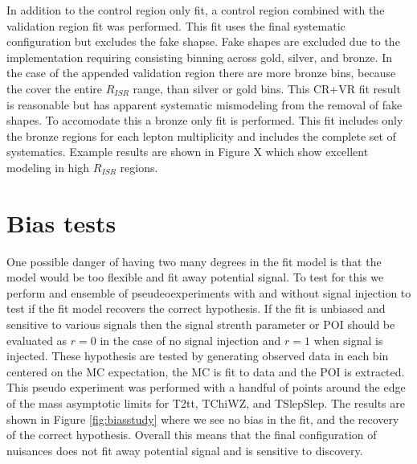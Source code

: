 In addition to the control region only fit, a control region combined with the validation region fit was performed. This fit uses the final systematic configuration but excludes the fake shapse. Fake shapes are excluded due to the implementation requiring consisting binning across gold, silver, and bronze. In the case of the appended validation region there are more bronze bins, because the cover the entire $R_{ISR}$ range, than silver or gold bins. This CR+VR fit result is reasonable but has apparent systematic mismodeling from the removal of fake shapes.  To accomodate this a bronze only fit is performed. This fit includes only the bronze regions for each lepton multiplicity and includes the complete set of systematics. Example results are shown in Figure X which show excellent modeling in high $R_{ISR}$ regions.

\section{Bias tests}

One possible danger of having two many degrees in the fit model is that the model would be too flexible and fit away potential signal. To test for this we perform and ensemble of pseudeoexperiments with and without signal injection to test if the fit model recovers the correct hypothesis.  If the fit is unbiased and sensitive to various signals then the signal strenth parameter or POI should be evaluated as $r=0$ in the case of no signal injection and $r=1$ when signal is injected.  These hypothesis are tested by generating observed data in each bin centered on the MC expectation, the MC is fit to data and the POI is extracted. This pseudo experiment was performed with a handful of points around the edge of the mass asymptotic limits for T2tt, TChiWZ, and TSlepSlep. The results are shown in Figure \ref{fig:biasstudy} where we see no bias in the fit, and the recovery of the correct hypothesis. Overall this means that the final configuration of nuisances does not fit away potential signal and is sensitive to discovery.

 


